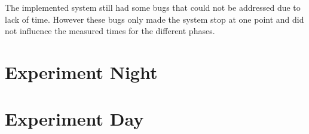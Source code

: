 The implemented system still had some bugs that could not be addressed due to lack of time. However these bugs only made the system stop at one point and did not influence the measured times for the different phases.
\section{Experiment Night}
\section{Experiment Day}